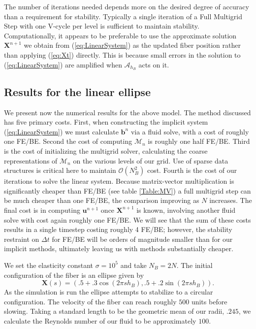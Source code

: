 \documentclass[preprint,12pt]{elsarticle}
\begin{document}
The number of iterations needed depends more on the desired degree of accuracy than a requirement for stability. Typically a single iteration of a Full Multigrid Step with one V-cycle per level is sufficient to maintain stability. 
Computationally, it appears to be preferable to use the approximate solution $\mathbf{X}^{n+1}$ we obtain from (\ref{eq:LinearSystem}) as the updated fiber position rather than applying (\ref{eq:Xt}) directly. This is because small errors in the solution to (\ref{eq:LinearSystem}) are amplified when $\mathcal{A}_{h_B}$ acts on it. 



\subsection{Results for the linear ellipse}
We present now the numerical results for the above model.
The method discussed has five primary costs. First, when constructing the implicit system (\ref{eq:LinearSystem}) we must calculate $\mathbf{b}^n$ via a fluid solve, with a cost of roughly one FE/BE. Second the cost of computing $\mathcal{M}_n$ is roughly one half FE/BE. Third is the cost of initializing the multigrid solver, calculating the coarse representations of $\mathcal{M}_n$ on the various levels of our grid. Use of sparse data structures is critical here to maintain $\mathcal{O}(N_B^2)$ cost. Fourth is the cost of our iterations to solve the linear system. Because matrix-vector multiplication is significantly cheaper than FE/BE (see table \ref{Table:MV}) a full multigrid step can be much cheaper than one FE/BE, the comparison improving as $N$ increases.
The final cost is in computing $\mathbf{u}^{n+1}$ once $\mathbf{X}^{n+1}$ is known, involving another fluid solve with cost again roughly one FE/BE. We will see that the sum of these costs results in a single timestep costing roughly 4 FE/BE; however, the stability restraint on $\Delta t$ for FE/BE will be orders of magnitude smaller than for our implicit methods, ultimately leaving us with methods substantially cheaper.

We set the elasticity constant $\sigma=10^5$ and take $N_B = 2N$. The initial configuration of the fiber is an ellipse given by
\begin{equation}
\mathbf{X}(s) = (.5 + .3\cos(2\pi sh_B), .5 + .2\sin(2\pi sh_B)).
\end{equation}
As the simulation is run the ellipse attempts to stabilize to a circular configuration. The velocity of the fiber can reach roughly $500$ units before slowing. Taking a standard length to be the geometric mean of our radii, $.245$, we calculate the Reynolds number of our fluid to be approximately $100$.
\end{document}
